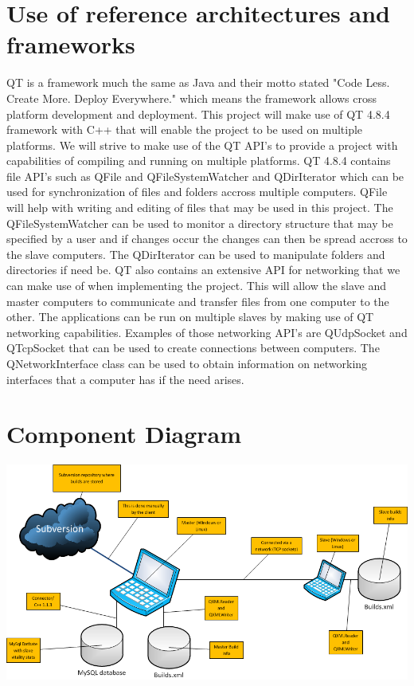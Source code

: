 \documentclass[a4paper,12pt,final]{article}
\begin{document}
\section{Use of reference architectures and\\ frameworks}
QT is a framework much the same as Java and their motto stated "Code Less. Create More. Deploy Everywhere." which means the framework allows cross platform development and deployment. This project will make use of QT 4.8.4 framework with C++ that will enable the project to be used on multiple platforms. We will strive to make use of the QT API's to provide a project with capabilities of compiling and running on multiple platforms.
\vspace{6pt}\newline
QT 4.8.4 contains file API's such as QFile and QFileSystemWatcher and QDirIterator which can be used for synchronization of files and folders accross multiple computers. QFile will help with writing and editing of files that may be used in this project. The QFileSystemWatcher can be used to monitor a directory structure that may be specified by a user and if changes occur the changes can then be spread accross to the slave computers. The QDirIterator can be used to manipulate folders and directories if need be.
\vspace{6pt}\newline
QT also contains an extensive API for networking that we can make use of when implementing the project. This will allow the slave and master computers to communicate and transfer files from one computer to the other. The applications can be run on multiple slaves by making use of QT networking capabilities. Examples of those networking API's are QUdpSocket and QTcpSocket that can be used to create connections between computers. The QNetworkInterface class can be used to obtain information on networking interfaces that a computer has if the need arises.

\newpage
\section{Component Diagram}
\begin{center}
\includegraphics[angle = 90, scale=0.7]{ComponentDiag.png}
\end{center}
\end{document}

